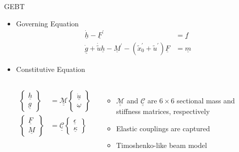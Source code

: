 \documentclass[xcolor=cmyk]{beamer}
\newcommand{\tens}[1]{\underline{\underline{#1}}}
\begin{document}
\begin{frame}{GEBT}
\begin{itemize}
    \item Governing Equation
      \begin{align*} 
      \dot{\underline{h}} - \underline{F}^\prime &= \underline{f} \\
      \dot{\underline{g}} + \dot{\widetilde{u}} \underline{h} -
      \underline{M}^\prime - (\widetilde{x}_0^\prime + \widetilde{u}^\prime) \underline{F}
      &= \underline{m} 
      \end{align*}
    
    \item Constitutive Equation
    \begin{columns}[c]
      \column{2.0 in}
      
      \begin{align*}
      \begin{Bmatrix} \underline{h} \\ \underline{g} \end{Bmatrix} &=
      \underline{\underline{\mathcal{M}}} \begin{Bmatrix} \dot{\underline{u}} \\
      \underline{\omega} \end{Bmatrix} \\
      \begin{Bmatrix} \underline{F} \\ \underline{M} \end{Bmatrix} &=
      \underline{\underline{\mathcal{C}}} \begin{Bmatrix} \underline{\epsilon} \\
      \underline{\kappa} \end{Bmatrix} 
      \end{align*}
      \column{2.0 in}
      \begin{itemize}
        \scriptsize
        \pause
        \item
        $\tens{\mathcal{M}}$ and $\tens{\mathcal{C}}$ are $6 \times 6$ sectional mass and stiffness matrices, respectively \pause
        \item
        Elastic couplings are captured \pause
        \item
        Timoshenko-like beam model
      \end{itemize}
      
      \end{columns}


\end{itemize}
\end{frame}
\end{document}
